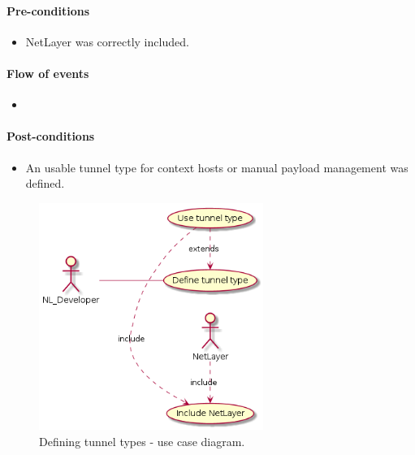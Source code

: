 \documentclass[12pt]{report}
\begin{document}
                    \paragraph{Pre-conditions}
                        \begin{itemize}
                            \item NetLayer was correctly included.
                        \end{itemize}

                    \paragraph{Flow of events}
                        \begin{itemize}
                            \item
                        \end{itemize}

                    \paragraph{Post-conditions}
                        \begin{itemize}
                            \item An usable tunnel type for context hosts or manual payload management was defined.
                        \end{itemize}

                    \begin{figure}[H]
                    \caption{Defining tunnel types - use case diagram.}
                    \centering
                    \includegraphics[width=0.65\textwidth]{d/uc/def_tunnels.png}
                    \end{figure}
\end{document}
